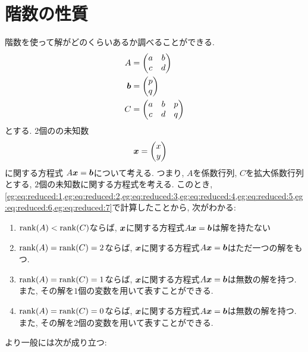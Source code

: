 \section{階数の性質}
階数を使って解がどのくらいあるか調べることができる.
\begin{align*}
  A&=
  \begin{pmatrix}
    a&b\\
    c&d
  \end{pmatrix}\\
  \boldsymbol{b}&=
  \begin{pmatrix}
    p\\
    q
  \end{pmatrix}\\
  C&=
  \begin{pmatrix}
    a&b&p\\
    c&d&q
  \end{pmatrix}
\end{align*}
とする. 2個のの未知数
\begin{align*}
  \boldsymbol{x}&=
  \begin{pmatrix}
    x\\y
  \end{pmatrix}
\end{align*}
に関する方程式 $A\boldsymbol{x}=\boldsymbol{b}$について考える.
つまり, $A$を係数行列, $C$を拡大係数行列とする,
$2$個の未知数に関する方程式を考える.
このとき, \cref{eg:eq:reduced:1,eg:eq:reduced:2,eg:eq:reduced:3,eg:eq:reduced:4,eg:eq:reduced:5,eg:eq:reduced:6,eg:eq:reduced:7}で計算したことから,
次がわかる:
\begin{enumerate}
  \item $\operatorname{rank}(A)<\operatorname{rank}(C)$ならば,
  $\boldsymbol{x}$に関する方程式$A\boldsymbol{x}=\boldsymbol{b}$は解を持たない
  \item $\operatorname{rank}(A)=\operatorname{rank}(C)=2$ならば,
  $\boldsymbol{x}$に関する方程式$A\boldsymbol{x}=\boldsymbol{b}$はただ一つの解をもつ.
  \item $\operatorname{rank}(A)=\operatorname{rank}(C)=1$ならば,
    $\boldsymbol{x}$に関する方程式$A\boldsymbol{x}=\boldsymbol{b}$は無数の解を持つ.
    また, その解を$1$個の変数を用いて表すことができる.
  \item $\operatorname{rank}(A)=\operatorname{rank}(C)=0$ならば,
    $\boldsymbol{x}$に関する方程式$A\boldsymbol{x}=\boldsymbol{b}$は無数の解を持つ.
    また, その解を$2$個の変数を用いて表すことができる.
\end{enumerate}
より一般には次が成り立つ:
